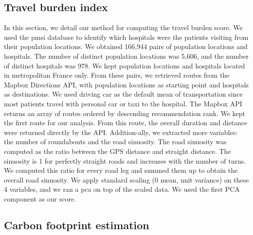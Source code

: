 \subsection{Travel burden index}

In this section, we detail our method for computing the travel burden score. We
used the \ac{pmsi} database to identify which hospitals were the patients
visiting from their population locations. We obtained 166,944 pairs of
population locations and hospitals. The number of distinct population locations
was 5,606, and the number of distinct hospitals was 978. We kept population
locations and hospitals located in metropolitan France only. From these pairs,
we retrieved routes from the Mapbox Directions API, with population locations as
starting point and hospitals as destinations.  We used driving car as the
default mean of transportation since most patients travel with personal car or
taxi to the hospital. The Mapbox API returns an array of routes ordered by
descending recommendation rank. We kept the first route for our analysis. From
this route, the overall duration and distance were returned directly by the API.
Addition-ally, we extracted more variables: the number of roundabouts and the
road sinuosity. The road sinuosity was computed as the ratio between the GPS
distance and straight distance. The sinuosity is 1 for perfectly straight roads
and increases with the number of turns. We computed this ratio for every road
leg and summed them up to obtain the overall road sinuosity. We apply standard
scaling (0 mean, unit variance) on these 4 variables, and we ran a \ac{pca} on
top of the scaled data. We used the first PCA component as our score.

\subsection{Carbon footprint estimation}

